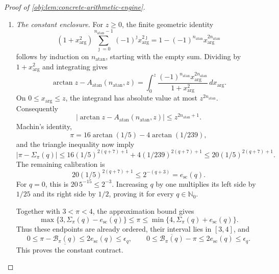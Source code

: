 \begin{proof}[Proof of \cref{obj:lem:concrete-arithmetic-engine}]
\begin{enumerate}
\item \emph{The constant enclosure.}
For \(z\ge0\), the finite geometric identity
\[
(1+x_{\mathrm{arg}}^2)
 \sum_{\jmath=0}^{n_{\mathrm{atan}}-1}
       (-1)^\jmath x_{\mathrm{arg}}^{2\jmath}
 =
1-(-1)^{n_{\mathrm{atan}}}
       x_{\mathrm{arg}}^{2n_{\mathrm{atan}}}
\]
follows by induction on \(n_{\mathrm{atan}}\), starting with the empty sum. Dividing by \(1+x_{\mathrm{arg}}^2\) and integrating gives
\[
\arctan z-A_{\mathrm{atan}}(n_{\mathrm{atan}},z)
 =
\int_0^z
 \frac{(-1)^{n_{\mathrm{atan}}}
        x_{\mathrm{arg}}^{2n_{\mathrm{atan}}}}
      {1+x_{\mathrm{arg}}^2}\,dx_{\mathrm{arg}}.
\]
On \(0\le x_{\mathrm{arg}}\le z\), the integrand has absolute value at most
\(z^{2n_{\mathrm{atan}}}\). Consequently
\[
|\arctan z-A_{\mathrm{atan}}(n_{\mathrm{atan}},z)|
 \le z^{2n_{\mathrm{atan}}+1}.
\]
Machin's identity,
\[
\pi=16\arctan(1/5)-4\arctan(1/239),
\]
and the triangle inequality now imply
\[
|\pi-\Sigma_\pi(q)|
 \le16(1/5)^{2(q+7)+1}
    +4(1/239)^{2(q+7)+1}
 \le20(1/5)^{2(q+7)+1}.
\]
The remaining calibration is
\[
20(1/5)^{2(q+7)+1}\le2^{-(q+3)}=e_{\mathrm{sc}}(q).
\]
For \(q=0\), this is \(20\,5^{-15}\le2^{-3}\). Increasing \(q\) by one multiplies its left side by \(1/25\) and its right side by \(1/2\), proving it for every \(q\in\mathbb N_0\).

Together with \(3<\pi<4\), the approximation bound gives
\[
\max\{3,\Sigma_\pi(q)-e_{\mathrm{sc}}(q)\}
 \le\pi\le
\min\{4,\Sigma_\pi(q)+e_{\mathrm{sc}}(q)\}.
\]
Thus these endpoints are already ordered, their interval lies in \([3,4]\), and
\[
0\le\pi-\underline{\mathcal B_\pi(q)}
 \le2e_{\mathrm{sc}}(q)\le\epsilon_q,
\qquad
0\le\overline{\mathcal B_\pi(q)}-\pi
 \le2e_{\mathrm{sc}}(q)\le\epsilon_q.
\]
This proves the constant contract.


\end{enumerate}
\end{proof}

